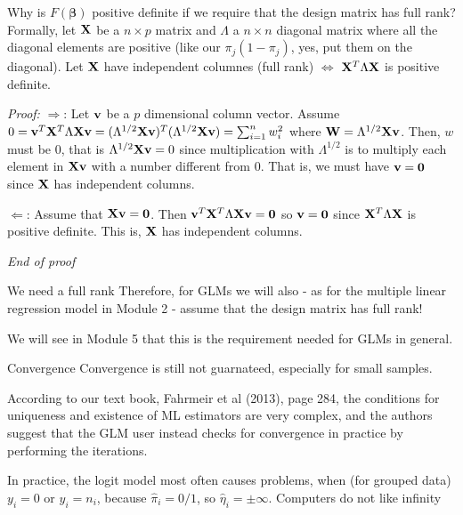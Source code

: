 \documentclass[
  ignorenonframetext,
]{beamer}
\begin{document}
\begin{frame}
\begin{block}{Why is \(F(\boldsymbol{\beta})\) positive definite if we
require that the design matrix has full rank?}
\protect\hypertarget{why-is-fboldsymbolbeta-positive-definite-if-we-require-that-the-design-matrix-has-full-rank}{}
Formally, let \({\bf X}\) be a \(n\times p\) matrix and \(\Lambda\) a
\(n\times n\) diagonal matrix where all the diagonal elements are
positive (like our \(\pi_j(1-\pi_j)\), yes, put them on the diagonal).
Let \({\bf X}\) have independent columnes (full rank)
\(\Leftrightarrow\) \({\bf X}^T\Lambda{\bf X}\) is positive definite.

\emph{Proof:} \(\Rightarrow\): Let \({\bf v}\) be a \(p\) dimensional
column vector. Assume
\(0={\bf v}^T {\bf X}^T \Lambda {\bf X} {\bf v}=(\Lambda^{1/2}{\bf X}{\bf v})^T(\Lambda^{1/2}{\bf X}{\bf v})=\sum_{i=1}^n w_i^2\)
where \({\bf W}=\Lambda^{1/2}{\bf X}{\bf v}\). Then, \(w\) must be 0,
that is \(\Lambda^{1/2}{\bf X}{\bf v}=0\) since multiplication with
\(\Lambda^{1/2}\) is to multiply each element in \({\bf X}{\bf v}\) with
a number different from 0. That is, we must have \({\bf v}={\bf 0}\)
since \({\bf X}\) has independent columns.

\(\Leftarrow\): Assume that \({\bf X}{\bf v}={\bf 0}\). Then
\({\bf v}^T {\bf X}^T \Lambda {\bf X} {\bf v}={\bf 0}\) so
\({\bf v}={\bf 0}\) since \({\bf X}^T\Lambda{\bf X}\) is positive
definite. This is, \({\bf X}\) has independent columns.

\emph{End of proof}
\end{block}
\end{frame}

\begin{frame}
\begin{block}{We need a full rank}
\protect\hypertarget{we-need-a-full-rank}{}
Therefore, for GLMs we will also - as for the multiple linear regression
model in Module 2 - assume that the design matrix has full rank!

We will see in Module 5 that this is the requirement needed for GLMs in
general.
\end{block}
\end{frame}

\begin{frame}
\begin{block}{Convergence}
\protect\hypertarget{convergence}{}
Convergence is still not guarnateed, especially for small samples.

According to our text book, Fahrmeir et al (2013), page 284, the
conditions for uniqueness and existence of ML estimators are very
complex, and the authors suggest that the GLM user instead checks for
convergence in practice by performing the iterations.

In practice, the logit model most often causes problems, when (for
grouped data) \(y_i=0\) or \(y_i=n_i\), because \(\hat{\pi}_i=0/1\), so
\(\hat{\eta}_i=\pm \infty\). Computers do not like infinity
\end{block}
\end{frame}
\end{document}
